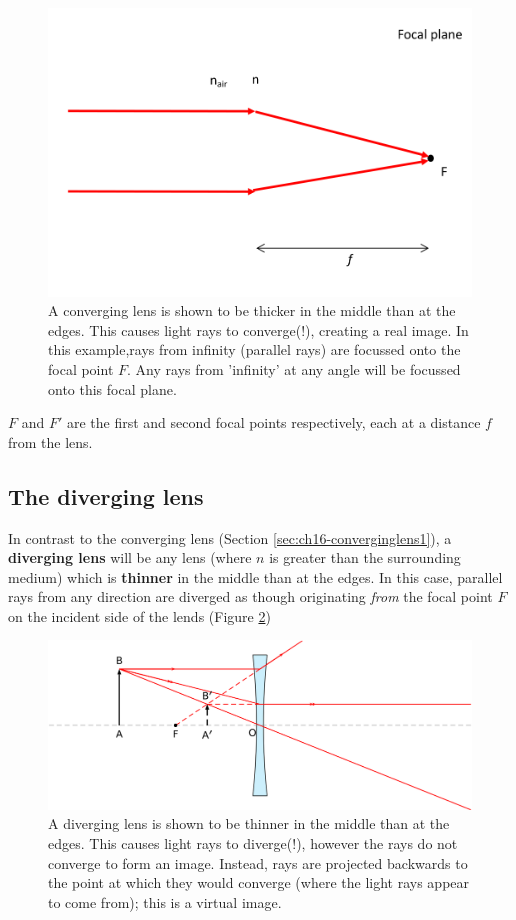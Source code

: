 \documentclass[
]{book}
\begin{document}
\begin{figure}

{\centering \includegraphics[width=0.7\linewidth]{visualisations/LaTeX/ch16-focalplane1} 

}

\caption{A converging lens is shown to be thicker in the middle than at the edges. This causes light rays to converge(!), creating a real image. In this example,rays from infinity (parallel rays) are focussed onto the focal point $F$. Any rays from 'infinity' at any angle will be focussed onto this focal plane.}\label{fig:ch16-converginglens1}
\end{figure}

\(F\) and \(F'\) are the first and second focal points respectively, each at a distance \(f\) from the lens.

\hypertarget{sec:ch16-diverginglens1}{%
\subsection{The diverging lens}\label{sec:ch16-diverginglens1}}

In contrast to the converging lens (Section \ref{sec:ch16-converginglens1}), a \textbf{diverging lens} will be any lens (where \(n\) is greater than the surrounding medium) which is \textbf{thinner} in the middle than at the edges. In this case, parallel rays from any direction are diverged as though originating \emph{from} the focal point \(F\) on the incident side of the lends (Figure \ref{fig:ch16-diverginglens1})

\begin{figure}

{\centering \includegraphics[width=0.7\linewidth]{visualisations/LaTeX/ch16-diverginglens1} 

}

\caption{A diverging lens is shown to be thinner in the middle than at the edges. This causes light rays to diverge(!), however the rays do not converge to form an image. Instead, rays are projected backwards to the point at which they would converge (where the light rays appear to come from); this is a virtual image. }\label{fig:ch16-diverginglens1}
\end{figure}
\end{document}
